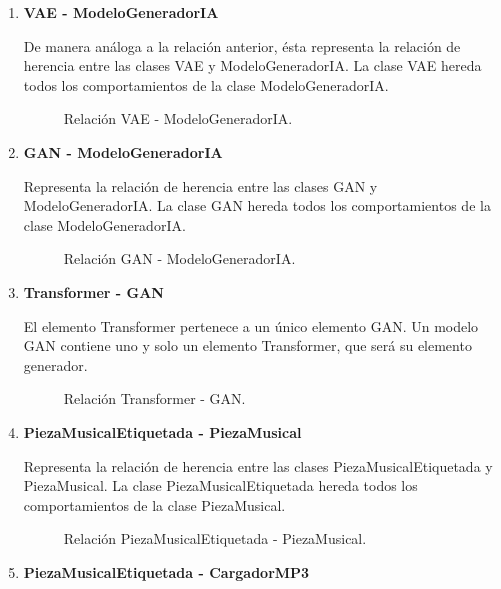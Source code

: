 \begin{enumerate}
  \item \textbf{VAE - ModeloGeneradorIA}

  De manera análoga a la relación anterior, ésta representa la relación de herencia entre las clases VAE y ModeloGeneradorIA. La clase VAE hereda todos los comportamientos de la clase ModeloGeneradorIA.

  \begin{figure}[H]
    \centering
    
    \caption{Relación VAE - ModeloGeneradorIA.}
  \end{figure}

  \item \textbf{GAN - ModeloGeneradorIA}

  Representa la relación de herencia entre las clases GAN y ModeloGeneradorIA. La clase GAN hereda todos los comportamientos de la clase ModeloGeneradorIA.

  \begin{figure}[H]
    \centering
    
    \caption{Relación GAN - ModeloGeneradorIA.}
  \end{figure}

  \item \textbf{Transformer - GAN}

  El elemento Transformer pertenece a un único elemento GAN. Un modelo GAN contiene uno y solo un elemento Transformer, que será su elemento generador.

  \begin{figure}[H]
    \centering
    
    \caption{Relación Transformer - GAN.}
  \end{figure}

  \item \textbf{PiezaMusicalEtiquetada - PiezaMusical}

  Representa la relación de herencia entre las clases PiezaMusicalEtiquetada y PiezaMusical. La clase PiezaMusicalEtiquetada hereda todos los comportamientos de la clase PiezaMusical.

  \begin{figure}[H]
    \centering
    
    \caption{Relación PiezaMusicalEtiquetada - PiezaMusical.}
  \end{figure}

  \item \textbf{PiezaMusicalEtiquetada - CargadorMP3}


\end{enumerate}
